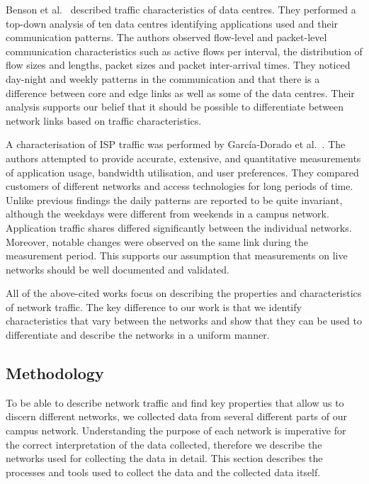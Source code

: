 Benson et al.~\cite{Benson-2010-Network} described traffic characteristics of data centres. They performed a top-down analysis of ten data centres identifying applications used and their communication patterns. The authors observed flow-level and packet-level communication characteristics such as active flows per interval, the distribution of flow sizes and lengths, packet sizes and packet inter-arrival times. They noticed day-night and weekly patterns in the communication and that there is a difference between core and edge links as well as some of the data centres. Their analysis supports our belief that it should be possible to differentiate between network links based on traffic characteristics.

A characterisation of ISP traffic was performed by García-Dorado et al.~\cite{Garcia-Dorado-2012-Characterization}. The authors attempted to provide accurate, extensive, and quantitative measurements of application usage, bandwidth utilisation, and user preferences. They compared customers of different networks and access technologies for long periods of time. Unlike previous findings the daily patterns are reported to be quite invariant, although the weekdays were different from weekends in a campus network. Application traffic shares differed significantly between the individual networks. Moreover, notable changes were observed on the same link during the measurement period. This supports our assumption that measurements on live networks should be well documented and validated.

All of the above-cited works focus on describing the properties and characteristics of network traffic. The key difference to our work is that we identify characteristics that vary between the networks and show that they can be used to differentiate and describe the networks in a uniform manner.

\subsection{Methodology} \label{subsec:characterization-methodology}

To be able to describe network traffic and find key properties that allow us to discern different networks, we collected data from several different parts of our campus network. Understanding the purpose of each network is imperative for the correct interpretation of the data collected, therefore we describe the networks used for collecting the data in detail. This section describes the processes and tools used to collect the data and the collected data itself. 

